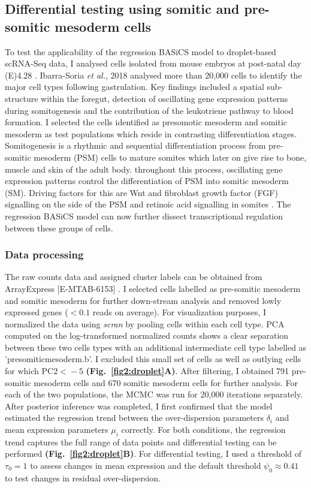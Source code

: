 \newpage

\subsection{Differential testing using somitic and pre-somitic mesoderm cells}

To test the applicability of the regression BASiCS model to droplet-based scRNA-Seq data, I analysed cells isolated from mouse embryos at post-natal day (E)4.28 \citep{Ibarra-Soria2018}. Ibarra-Soria \emph{et al.}, 2018 analysed more than 20,000 cells to identify the major cell types following gastrulation. Key findings included a spatial sub-structure within the foregut, detection of oscillating gene expression patterns during somitogenesis and the contribution of the leukotriene pathway to blood formation. I selected the cells identified as presomotic mesoderm and somitic mesoderm as test populations which reside in contrasting differentiation stages. Somitogenesis is a rhythmic and sequential differentiation process from pre-somitic mesoderm (PSM) cells to mature somites which later on give rise to bone, muscle and skin of the adult body. throughout this process, oscillating gene expression patterns control the differentiation of PSM into somitic mesoderm (SM). Driving factors for this are Wnt and fibroblast growth factor (FGF) signalling on the side of the PSM and retinoic acid signalling in somites \cite{Oates2012}. The regression BASiCS model can now further dissect transcriptional regulation between these groups of cells.

\subsubsection{Data processing}

The raw counts data and assigned cluster labels can be obtained from ArrayExpress [E-MTAB-6153] \citep{Ibarra-Soria2018}. I selected cells labelled as pre-somitic mesoderm and somitic mesoderm for further down-stream analysis and removed lowly expressed genes ($< 0.1$ reads on average). For visualization purposes, I normalized the data using \emph{scran} by pooling cells within each cell type. PCA computed on the log-transformed normalized counts shows a clear separation between these two cells types with an additional intermediate cell type labelled as 'presomiticmesoderm.b'. I excluded this small set of cells as well as outlying cells for which $\text{PC2}{}<{}-5$ \textbf{(Fig.~\ref{fig2:droplet}A)}. After filtering, I obtained 791 pre-somitic mesoderm cells and 670 somitic mesoderm cells for further analysis. For each of the two populations, the MCMC was run for 20,000 iterations separately. After posterior inference was completed, I first confirmed that the model estimated the regression trend between the over-dispersion parameters $\delta_i$ and mean expression parameters $\mu_i$ correctly. For both conditions, the regression trend captures the full range of data points and differential testing can be performed \textbf{(Fig.~\ref{fig2:droplet}B)}. For differential testing, I used a threshold of $\tau_0=1$ to assess changes in mean expression and the default threshold $\psi_0\approx{}0.41$ to test changes in residual over-dispersion.  


